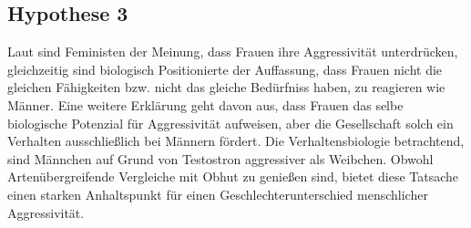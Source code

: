 \subsection{Hypothese 3}    \label{subsec_2.2.3}
Laut %
sind Feministen der Meinung, dass Frauen ihre Aggressivität unterdrücken, 
gleichzeitig sind biologisch Positionierte der Auffassung, dass Frauen nicht die gleichen 
Fähigkeiten bzw. nicht das gleiche Bedürfniss haben, zu reagieren wie Männer. Eine weitere
Erklärung geht davon aus, dass Frauen das selbe biologische Potenzial für Aggressivität
aufweisen, aber die Gesellschaft solch ein Verhalten ausschließlich bei Männern fördert.
Die Verhaltensbiologie betrachtend, sind Männchen auf Grund von Testostron aggressiver als
Weibchen. Obwohl Artenübergreifende Vergleiche mit Obhut zu genießen sind, bietet diese 
Tatsache einen starken Anhaltspunkt für einen Geschlechterunterschied menschlicher
Aggressivität.
